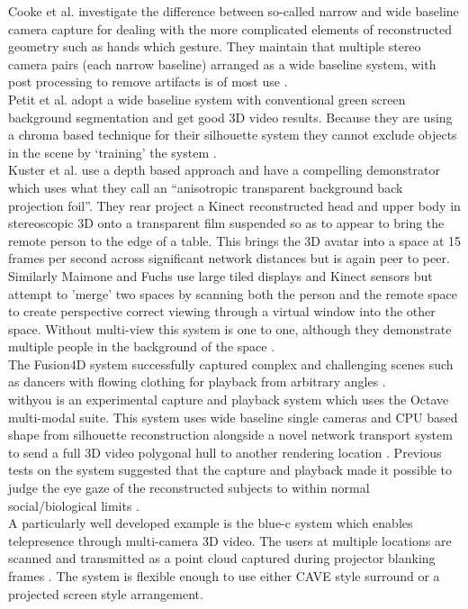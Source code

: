                         Cooke et al. investigate the difference between so-called narrow and wide baseline camera capture for dealing with the more complicated elements of reconstructed geometry such as hands which gesture. They maintain that multiple stereo camera pairs (each narrow baseline) arranged as a wide baseline system, with post processing to remove artifacts is of most use \cite{Cooke_image-basedrendering}.\\
                        Petit et al. adopt a wide baseline system with conventional green screen background segmentation and get good 3D video results. Because they are using a chroma based technique for their silhouette system they cannot exclude objects in the scene by `training' the system \cite{Petit2010}.\\
Kuster et al. use a depth based approach and have a compelling demonstrator which uses what they call an ``anisotropic transparent background back projection foil''. They rear project a Kinect reconstructed head and upper body in stereoscopic 3D onto a transparent film suspended so as to appear to bring the remote person to the edge of a table. This brings the 3D avatar into a space at 15 frames per second across significant network distances but is again peer to peer\cite{Kuster2012a}.\\
Similarly Maimone and Fuchs use large tiled displays and Kinect sensors but attempt to 'merge' two spaces by scanning both the person and the remote space to create perspective correct viewing through a virtual window into the other space. Without multi-view this system is one to one, although they demonstrate multiple people in the background of the space \cite{Maimone2011a}.\\
       The Fusion4D system successfully captured complex and challenging scenes such as dancers with flowing clothing for playback from arbitrary angles \cite{Dou2016}.\\
withyou is an experimental capture and playback system which uses the Octave multi-modal suite. This system uses wide baseline single cameras and CPU based shape from silhouette reconstruction alongside a novel network transport system to send a full 3D video polygonal hull to another rendering location \cite{Roberts2015}. Previous tests on the system suggested that the capture and playback made it possible to judge the eye gaze of the reconstructed subjects to within normal social/biological limits \cite{Roberts2013}.\\
A particularly well developed example is the blue-c system which enables telepresence through multi-camera 3D video. The users at multiple locations are scanned and transmitted as a point cloud captured during projector blanking frames \cite{Gross2003}. The system is flexible enough to use either CAVE style surround or a projected screen style arrangement.\\
